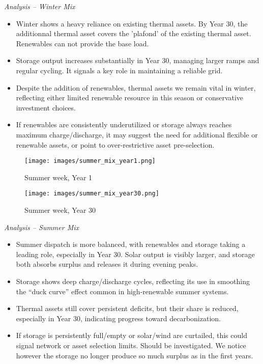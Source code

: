 \textit{Analysis -- Winter Mix}
\vspace{-0.4em}
\begin{itemize}
    \item Winter shows a heavy reliance on existing thermal assets. By Year 30, the additionnal thermal 
    asset covers the 'plafond' of the existing thermal asset. Renewables can not provide the base load.
    \item Storage output increases substantially in Year 30, managing larger ramps and regular cycling.
    It signals a key role in maintaining a reliable grid.
    \item Despite the addition of renewables, thermal assets we 
    remain vital in winter, reflecting either limited renewable resource in this season or 
    conservative investment choices.
    \item If renewables are consistently underutilized or storage 
    always reaches maximum charge/discharge, it may suggest the need for additional flexible 
    or renewable assets, or point to over-restrictive asset pre-selection.
\end{itemize}

\newpage
\begin{figure}[h!]
    \centering
    \texttt{[image: images/summer\_mix\_year1.png]}
    \caption{Summer week, Year 1}
    \label{fig:summer_mix_year1}
\end{figure}
\begin{figure}[h!]
    \centering
    \texttt{[image: images/summer\_mix\_year30.png]}
    \caption{Summer week, Year 30}
    \label{fig:summer_mix_year30}
\end{figure}


\textit{Analysis -- Summer Mix}
\vspace{-0.4em}  
\begin{itemize}
    \item Summer dispatch is more balanced, with renewables and storage taking a 
    leading role, especially in Year 30. Solar output is visibly larger, and storage both absorbs 
    surplus and releases it during evening peaks.
    \item Storage shows deep charge/discharge cycles, reflecting its use in 
    smoothing the “duck curve” effect common in high-renewable summer systems.
    \item Thermal assets still cover persistent deficits, but their 
    share is reduced, especially in Year 30, indicating progress toward decarbonization.
    \item If storage is persistently full/empty or solar/wind are curtailed, 
    this could signal network or asset selection limits. Should be investigated. 
    We notice however the storage no longer produce so much surplus as in the first years.
\end{itemize}

